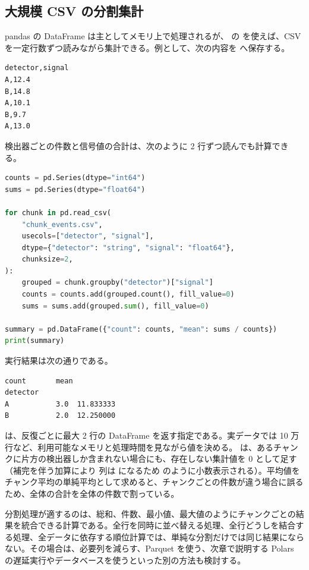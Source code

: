\subsection{大規模 CSV の分割集計}

pandas の DataFrame は主としてメモリ上で処理されるが、 の  を使えば、CSV を一定行数ずつ読みながら集計できる。例として、次の内容を  へ保存する。

\begin{lstlisting}[numbers=none, xleftmargin=2\zw, title={chunk\_events.csv}]
detector,signal
A,12.4
B,14.8
A,10.1
B,9.7
A,13.0
\end{lstlisting}

検出器ごとの件数と信号値の合計は、次のように 2 行ずつ読んでも計算できる。

\begin{lstlisting}[language=Python]
counts = pd.Series(dtype="int64")
sums = pd.Series(dtype="float64")

for chunk in pd.read_csv(
    "chunk_events.csv",
    usecols=["detector", "signal"],
    dtype={"detector": "string", "signal": "float64"},
    chunksize=2,
):
    grouped = chunk.groupby("detector")["signal"]
    counts = counts.add(grouped.count(), fill_value=0)
    sums = sums.add(grouped.sum(), fill_value=0)

summary = pd.DataFrame({"count": counts, "mean": sums / counts})
print(summary)
\end{lstlisting}

実行結果は次の通りである。

\begin{lstlisting}[numbers=none, xleftmargin=2\zw]
          count       mean
detector
A           3.0  11.833333
B           2.0  12.250000
\end{lstlisting}

 は、反復ごとに最大 2 行の DataFrame を返す指定である。実データでは 10 万行など、利用可能なメモリと処理時間を見ながら値を決める。 は、あるチャンクに片方の検出器しか含まれない場合にも、存在しない集計値を 0 として足す（補完を伴う加算により  列は  になるため  のように小数表示される）。平均値をチャンク平均の単純平均として求めると、チャンクごとの件数が違う場合に誤るため、全体の合計を全体の件数で割っている。

分割処理が適するのは、総和、件数、最小値、最大値のようにチャンクごとの結果を統合できる計算である。全行を同時に並べ替える処理、全行どうしを結合する処理、全データに依存する順位計算では、単純な分割だけでは同じ結果にならない。その場合は、必要列を減らす、Parquet を使う、次章で説明する Polars の遅延実行やデータベースを使うといった別の方法も検討する。

